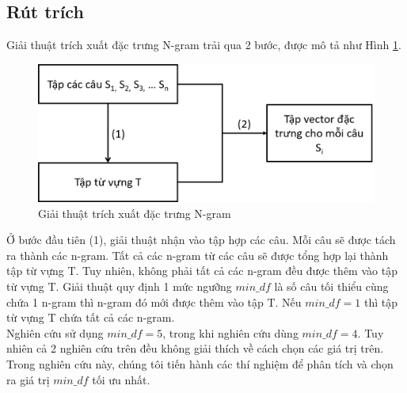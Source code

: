 \subsection*{Rút trích}
Giải thuật trích xuất đặc trưng N-gram trải qua 2 bước, được mô tả như Hình \ref{fig:mo-hinh-ngram}.\\
\begin{figure}[h]
\centering
\includegraphics[scale=0.30]{../hinh/mo-hinh-ngram.png}
\caption{Giải thuật trích xuất đặc trưng N-gram} \label{fig:mo-hinh-ngram}
\end{figure}

Ở bước đầu tiên (1), giải thuật nhận vào tập hợp các câu. Mỗi câu sẽ được tách ra thành các n-gram. Tất cả các n-gram từ các câu sẽ được tổng hợp lại thành tập từ vựng T. Tuy nhiên, không phải tất cả các n-gram đều được thêm vào tập từ vựng T. Giải thuật quy định 1 mức ngưỡng $min\_df$ là số câu tối thiểu cùng chứa 1 n-gram thì n-gram đó mới được thêm vào tập T. Nếu $min\_df=1$ thì tập từ vựng T chứa tất cả các n-gram. \\

Nghiên cứu \cite{sarker2011outcome} sử dụng $min\_df = 5$, trong khi nghiên cứu \cite{niu2005analysis} dùng $min\_df=4$. Tuy nhiên cả 2 nghiên cứu trên đều không giải thích về cách chọn các giá trị trên. Trong nghiên cứu này, chúng tôi tiến hành các thí nghiệm để phân tích và chọn ra giá trị $min\_df$ tối ưu nhất.\\

